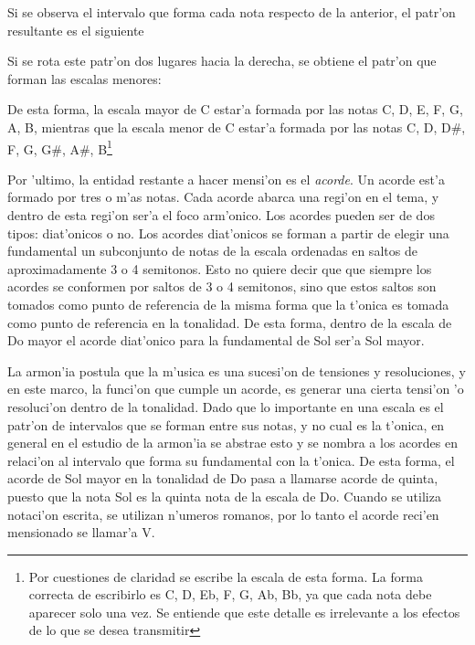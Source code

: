 Si se observa el intervalo que forma cada nota respecto de la anterior, el patr'on resultante es el siguiente

\begin{center}
      
\end{center}

Si se rota este patr'on dos lugares hacia la derecha, se obtiene el patr'on que forman las escalas menores:

\begin{center}
       
\end{center}

De esta forma, la escala mayor de C estar'a formada por las notas C, D, E, F, G, A, B, mientras que la escala menor de C estar'a formada
por las notas C, D, D\#, F, G, G\#, A\#, B\footnote{Por cuestiones de claridad se escribe la escala de esta forma. La forma correcta
de escribirlo es C, D, Eb, F, G, Ab, Bb, ya que cada nota debe aparecer solo una vez. Se entiende que este detalle es irrelevante a los efectos
de lo que se desea transmitir}


Por 'ultimo, la entidad restante a hacer mensi'on es el \emph{acorde}. Un acorde est'a formado por tres o m'as notas. Cada acorde abarca una regi'on
en el tema, y dentro de esta regi'on ser'a el foco arm'onico. Los acordes pueden ser de dos tipos: diat'onicos o no. 
Los acordes diat'onicos se forman a partir de elegir una fundamental un subconjunto de notas de la escala ordenadas en saltos de 
aproximadamente 3 o 4 semitonos. 
Esto no quiere decir que que siempre los acordes se conformen por saltos de 3 o 4 semitonos, sino que estos saltos son tomados como punto de referencia
de la misma forma que la t'onica es tomada como punto de referencia en la tonalidad.
De esta forma, dentro de la escala de Do mayor el acorde diat'onico para la fundamental de Sol ser'a Sol mayor. 

La armon'ia postula que la m'usica es una sucesi'on de tensiones y resoluciones, y en este marco, la funci'on que cumple un acorde, es generar una cierta
tensi'on 'o resoluci'on dentro de la tonalidad. Dado que lo importante en una escala es el patr'on de intervalos que se forman entre sus notas, y 
no cual es la t'onica, en general en el estudio de la armon'ia se abstrae esto y se nombra a los acordes en relaci'on al intervalo que forma su
fundamental con la t'onica. De esta forma, el acorde de Sol mayor en la tonalidad de Do pasa a llamarse acorde de quinta, puesto que la nota Sol
es la quinta nota de la escala de Do. Cuando se utiliza notaci'on escrita, se utilizan n'umeros romanos, por lo tanto el acorde reci'en mensionado
se llamar'a V. 

